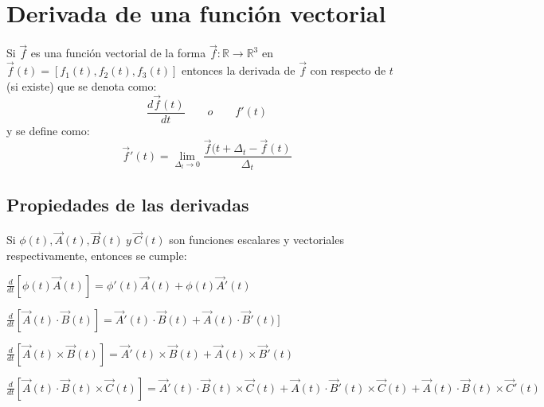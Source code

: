 \documentclass[a4paper]{article}
\begin{document}
\section{Derivada de una función vectorial}
Si $\vec{f}$ es una función vectorial de la forma $\vec{f}:\mathbb{R}\longrightarrow\mathbb{R}^3$ en $\vec{f}(t)=[f_1(t),f_2(t),f_3(t)]$ entonces la derivada de $\vec{f}$ con respecto de $t$ (si existe) que se denota como:
\[\frac{d\vec{f}(t)}{dt}\qquad o\qquad f'(t)\]
y se define como:
\[\vec{f}'(t)=\lim_{\Delta_t\rightarrow 0} \frac{\vec{f}(t+\Delta_t - \vec{f}(t)}{\Delta_t}\]
\subsection{Propiedades de las derivadas}
Si $\phi(t),\vec{A}(t),\vec{B}(t)\ y\ \vec{C}(t)$ son funciones escalares y vectoriales respectivamente, entonces se cumple:
\begin{enumerate}
{\item $\frac{d}{dt}[\phi(t)\vec{A}(t)]=\phi'(t)\vec{A}(t)+\phi(t)\vec{A}'(t)$}
{\item $\frac{d}{dt}[\vec{A}(t)\cdot\vec{B}(t)]=\vec{A}'(t)\cdot\vec{B}(t)+\vec{A}(t)\cdot\vec{B}'(t)]$}
{\item $\frac{d}{dt}[\vec{A}(t)\times\vec{B}(t)]=\vec{A}'(t)\times\vec{B}(t)+\vec{A}(t)\times\vec{B}'(t)$}
{\item $\frac{d}{dt}[\vec{A}(t)\cdot\vec{B}(t)\times\vec{C}(t)]=\vec{A}'(t)\cdot\vec{B}(t)\times\vec{C}(t)+\vec{A}(t)\cdot\vec{B}'(t)\times\vec{C}(t)+\vec{A}(t)\cdot\vec{B}(t)\times\vec{C}'(t)$}
\end{enumerate}
\end{document}
